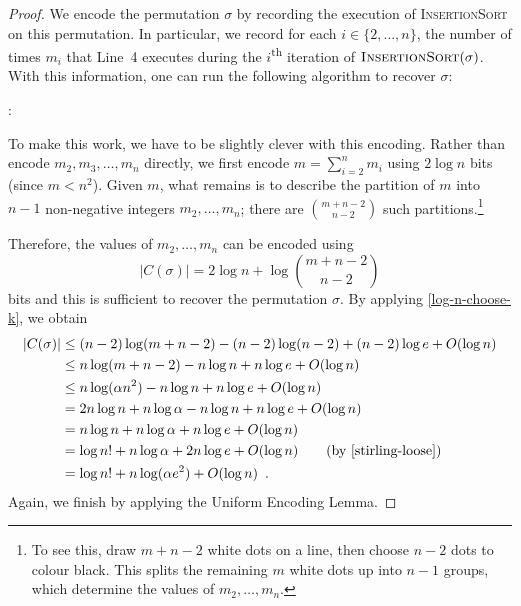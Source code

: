 \documentclass{patmorin}
\begin{document}
\begin{proof}
  We encode the permutation $\sigma$ by recording the execution of
  \textsc{InsertionSort} on this permutation. In particular, we record
  for each $i\in\{2,\ldots,n\}$, the number of times $m_i$ that Line~4
  executes during the $i$\textsuperscript{th} iteration of
  $\textsc{InsertionSort}(\sigma)$. With this information, one can run
  the following algorithm to recover $\sigma$:
  
  :
  \begin{algorithmic}[1]
       \ENDFOR
    \ENDFOR
    \RETURN{$\sigma$}
  \end{algorithmic}
   
  To make this work, we have to be slightly clever with this
  encoding. Rather than encode $m_2,m_3,\ldots,m_n$ directly, we first
  encode $m=\sum_{i=2}^{n} m_i$ using $2\log n$ bits (since
  $m < n^2$). Given $m$, what remains is to describe the partition of
  $m$ into $n-1$ non-negative integers $m_2,\ldots,m_n$; there are
  $\binom{m+n-2}{n-2}$ such partitions.\footnote{To see this, draw
    $m+n-2$ white dots on a line, then choose $n-2$ dots to colour
    black. This splits the remaining $m$ white dots up into $n-1$
    groups, which determine the values of $m_2,\ldots,m_n$.}
  
  Therefore, the values of $m_2,\ldots,m_n$ can be encoded using
  \[
    |C(\sigma)| = 2\log n + \log\binom{m+n-2}{n-2}
  \]
  bits and this is sufficient to recover the permutation $\sigma$.  By
  applying \eqref{log-n-choose-k}, we obtain
  \begin{align*}
    |C(\sigma)| & \le (n-2)\log(m+n-2) - (n-2)\log(n-2)  + (n-2)\log e + O(\log n) \\
      & \le n\log(m+n-2) - n\log n   + n\log e + O(\log n) \\
      & \le n\log(\alpha n^2) - n\log n  + n\log e + O(\log n) \\
      & = 2n\log n + n\log\alpha - n\log n  + n\log e + O(\log n) \\
      & = n\log n + n\log\alpha + n\log e + O(\log n) \\
      & = \log n! + n\log\alpha + 2n\log e + O(\log n) \tag{by \eqref{stirling-loose}} \\
      & = \log n! + n \log (\alpha e^2) + O(\log n) \enspace .
  \end{align*}
  Again, we finish by applying the Uniform Encoding Lemma.
\end{proof}
\end{document}
